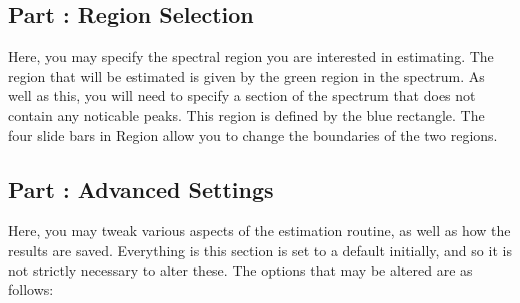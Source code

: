 \documentclass[12pt]{article}
\newcommand*\circled[2]{\tikz[baseline=(char.base)]{
    \node[shape=circle, draw={#2}, thick, inner sep=0.5pt] (char) {\textcolor{#2}{#1}};}}
\begin{document}
\subsection{Part \textmd{\protect\circled{2}{myblue}}: Region Selection}
Here, you may specify the spectral region you are interested in estimating. The region that will be estimated is given by the green region in the spectrum. As well as this, you will need to specify a section of the spectrum that does not contain any noticable peaks. This region is defined by the blue rectangle. The four slide bars in Region \circled{2}{myblue} allow you to change the boundaries of the two regions.

\subsection{Part \textmd{\protect\circled{3}{myorange}}: Advanced Settings}
Here, you may tweak various aspects of the estimation routine, as well as how the results are saved. Everything is this section is set to a default initially, and so it is not strictly necessary to alter these. The options that may be altered are as follows:
\end{document}
